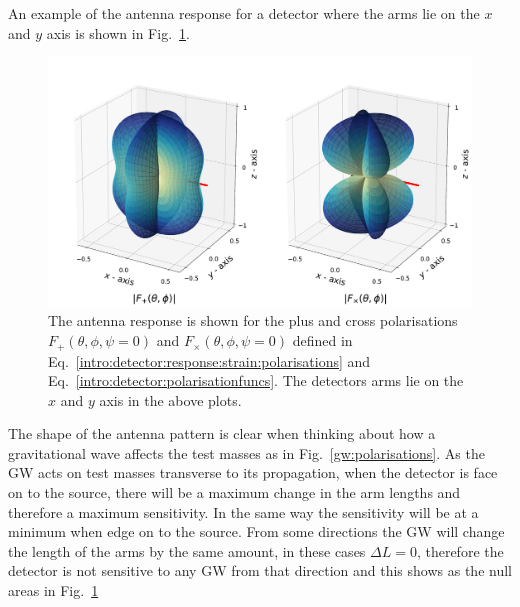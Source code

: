 An example of the antenna response for a detector where the arms lie on the $x$ and $y$ axis is shown in Fig.~\ref{intro:detector:response:polarisations}.
%
\begin{figure}[h]
    \centering
    \includegraphics[width=\textwidth]{C1_intro/antenna_pattern.pdf}
    \caption[Antenna response of the \gls{LIGO} detectors.]{The antenna
response is shown for the plus and cross polarisations $F_{+}(\theta,\phi,\psi=0)$ and $F_{\times}(\theta,\phi,\psi=0)$ defined in Eq.~\ref{intro:detector:response:strain:polarisations} and Eq.~\ref{intro:detector:polarisationfuncs}. The detectors arms lie on the $x$ and
$y$ axis in the above plots. } \label{intro:detector:response:polarisations}
\end{figure}
%
The shape of the antenna pattern is clear when thinking about how a gravitational wave affects the test masses as in
Fig.~\ref{gw:polarisations}.
 As the \gls{GW} acts on test masses transverse to its propagation,
when the detector is face on to the source, there will be a maximum change in
the arm lengths and therefore a maximum sensitivity.  In the same way the
sensitivity will be at a minimum when edge on to the source.
From some directions the \gls{GW} will change the length of the arms by the same amount, in these cases $\Delta L = 0$, therefore the detector is not sensitive to any \gls{GW} from that direction and this shows as the null areas in Fig.~\ref{intro:detector:response:polarisations} 

